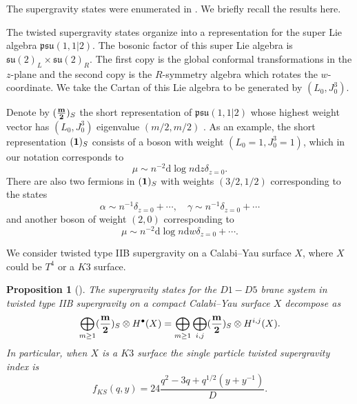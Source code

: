 \documentclass[11pt]{amsart}
\renewcommand{\d}{\mathrm{d}}
\def\bu{{\bullet}}
\def\lie#1{\ensuremath{\mathfrak{#1}}}
\newcommand\beqn{\begin{equation}}
\newcommand\eeqn{\end{equation}}
\theoremstyle{thm}
\newtheorem{prop}[theorem]{Proposition}
\numberwithin{equation}{subsection}
\theoremstyle{def}
\theoremstyle{rem}
\begin{document}
The supergravity states were enumerated in \cite{CPkoszul}. 
We briefly recall the results here. 

The twisted supergravity states organize into a representation for the super Lie algebra $\lie{psu}(1,1|2)$.
The bosonic factor of this super Lie algebra is $\lie{su}(2)_L \times \lie{su}(2)_R$. 
The first copy is the global conformal transformations in the $z$-plane and the second copy is the $R$-symmetry algebra which rotates the $w$-coordinate.
We take the Cartan of this Lie algebra to be generated by $(L_0, J_0^3)$. 
  
Denote by $(\frac{\bf m}{\bf 2})_S$ the short representation of $\lie{psu}(1,1|2)$ whose highest weight vector has $(L_0, J_0^3)$ eigenvalue $(m/2,m/2)$ \cite{dB1}. 
As an example, the short representation $({\bf 1})_S$ consists of a boson with weight $(L_0 = 1, J_0^3 = 1)$, which in our notation corresponds to 
\beqn
\mu \sim n^{-2} \d \log n \d z \delta_{z=0}  .
\eeqn 
There are also two fermions in $({\bf 1})_S$ with weights $(3/2,1/2)$ corresponding to the states
\beqn
\alpha \sim n^{-1} \delta_{z=0} + \cdots , \quad \gamma \sim n^{-1}\delta_{z=0} + \cdots
\eeqn
and another boson of weight $(2,0)$ corresponding to 
\beqn
\mu \sim n^{-2} \d \log n \d w \delta_{z=0} + \cdots .
\eeqn 

We consider twisted type IIB supergravity on a Calabi--Yau surface $X$, where $X$ could be $T^4$ or a $K3$ surface. 

\begin{prop}[\cite{CPkoszul}]
The supergravity states for the $D1-D5$ brane system in twisted type IIB supergravity on a compact Calabi--Yau surface $X$ decompose as
\beqn\label{eqn:IIBstates}
\bigoplus_{m \geq 1} (\frac{\bf m}{\bf 2})_S \otimes H^\bu(X) = \bigoplus_{m \geq 1} \bigoplus_{i,j} (\frac{\bf m}{\bf 2})_S \otimes H^{i,j} (X)  . 
\eeqn 
In particular, when $X$ is a $K3$ surface the single particle twisted supergravity index is 
\beqn\label{eqn:sugra_index}
f_{KS}(q,y) = 24 \frac{q^2 - 3 q + q^{1/2}(y+y^{-1})}{D} .
\eeqn
\end{prop} 
\end{document}
